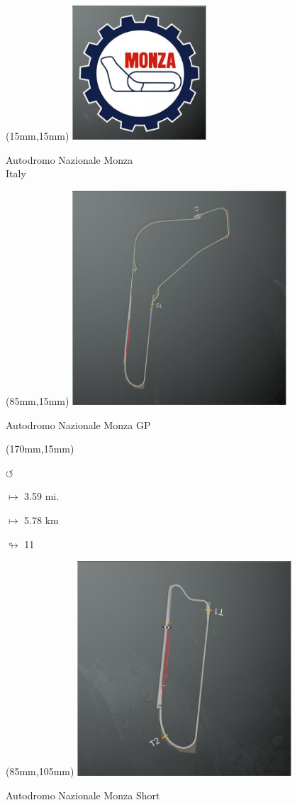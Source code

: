 \null\newpage

\begin{textblock*}{60mm}(15mm,15mm)%
\includegraphics[width=50mm]{LG/2015-05-20_00086.png}
\par Autodromo Nazionale Monza\\ Italy
\end{textblock*}
\begin{textblock*}{80mm}(85mm,15mm)%
\includegraphics[width=80mm]{TR/2015-05-20_00034.png}
\centerline{Autodromo Nazionale Monza GP}
\end{textblock*}
\begin{textblock*}{30mm}(170mm,15mm)%
\par \Huge$\circlearrowleft$
\Large
\par$\mapsto$ 3.59 mi.
\par$\mapsto$ 5.78 km
\par$\looparrowright$ 11
\end{textblock*}
\begin{textblock*}{80mm}(85mm,105mm)%
\includegraphics[width=80mm]{TR/2015-05-20_00035.png}
\centerline{Autodromo Nazionale Monza Short}
\end{textblock*}
